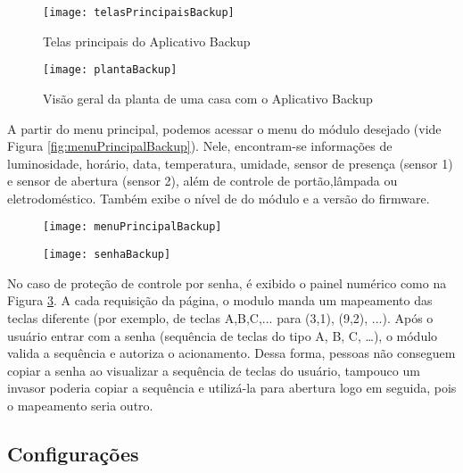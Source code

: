 \begin{figure}[H]
	\centering
	\caption{Telas principais do Aplicativo Backup}
  \texttt{[image: telasPrincipaisBackup]}
\label{fig:telasPrincipaisBackup}
\end{figure}

\begin{figure}[H]
  \centering
  \caption{Visão geral da planta de uma casa com o Aplicativo Backup}
  \texttt{[image: plantaBackup]}
  \label{fig:plantaBackup}
\end{figure}

A partir do menu principal, podemos acessar o menu do módulo desejado (vide Figura \ref{fig:menuPrincipalBackup}). Nele, encontram-se informações de luminosidade, horário, data, temperatura, umidade, sensor de presença (sensor 1) e sensor de abertura (sensor 2), além de controle de portão,lâmpada ou eletrodoméstico. Também exibe o nível de \wwifi do módulo e a versão do firmware.

\begin{figure}[hbp]
    \centering
    \begin{minipage}{.4\linewidth}
        \centering
        \texttt{[image: menuPrincipalBackup]}
        \label{fig:menuPrincipalBackup}
    \end{minipage}
    \hfill
    \begin{minipage}{.4\linewidth}
        \centering
        \texttt{[image: senhaBackup]}
        \label{fig:senhaBackup}
    \end{minipage}
\end{figure}

No caso de proteção de controle por senha, é exibido o painel numérico como na Figura \ref{fig:senhaBackup}. A cada requisição da página, o modulo manda um mapeamento das teclas diferente (por exemplo, de teclas A,B,C,... para (3,1), (9,2), ...). Após o usuário entrar com a senha (sequência de teclas do tipo A, B, C, …), o módulo valida a sequência e autoriza o acionamento. Dessa forma, pessoas não conseguem copiar a senha ao visualizar a sequência de teclas do usuário, tampouco um invasor poderia copiar a sequência e utilizá-la para abertura logo em seguida, pois o mapeamento seria outro.

\subsection{Configurações}

